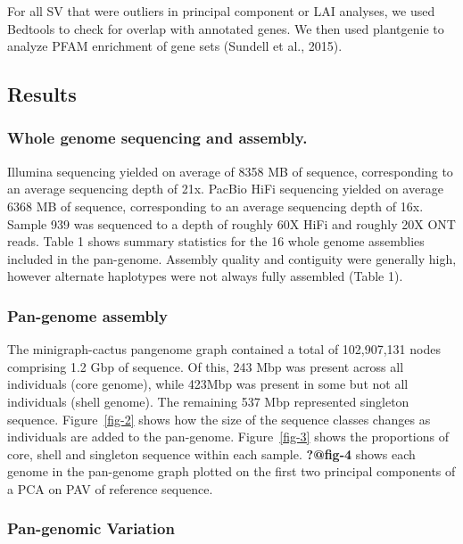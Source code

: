 \documentclass[
]{agujournal2019}
\begin{document}
For all SV that were outliers in principal component or LAI analyses, we
used Bedtools to check for overlap with annotated genes. We then used
plantgenie to analyze PFAM enrichment of gene sets (Sundell et al.,
2015).

\subsection{Results}\label{results}

\subsubsection{Whole genome sequencing and
assembly.}\label{whole-genome-sequencing-and-assembly.}

Illumina sequencing yielded on average of 8358 MB of sequence,
corresponding to an average sequencing depth of 21x. PacBio HiFi
sequencing yielded on average 6368 MB of sequence, corresponding to an
average sequencing depth of 16x. Sample 939 was sequenced to a depth of
roughly 60X HiFi and roughly 20X ONT reads. Table 1 shows summary
statistics for the 16 whole genome assemblies included in the
pan-genome. Assembly quality and contiguity were generally high, however
alternate haplotypes were not always fully assembled (Table 1).

\subsubsection{Pan-genome assembly}\label{pan-genome-assembly-1}

The minigraph-cactus pangenome graph contained a total of 102,907,131
nodes comprising 1.2 Gbp of sequence. Of this, 243 Mbp was present
across all individuals (core genome), while 423Mbp was present in some
but not all individuals (shell genome). The remaining 537 Mbp
represented singleton sequence. Figure~\ref{fig-2} shows how the size of
the sequence classes changes as individuals are added to the pan-genome.
Figure~\ref{fig-3} shows the proportions of core, shell and singleton
sequence within each sample. \textbf{?@fig-4} shows each genome in the
pan-genome graph plotted on the first two principal components of a PCA
on PAV of reference sequence.

\subsubsection{Pan-genomic Variation}\label{pan-genomic-variation}
\end{document}
